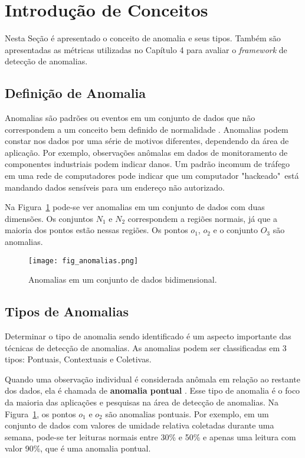 \documentclass[cic,tc]{iiufrgs}
\begin{document}
\section{Introdução de Conceitos}
\label{conceitos}
Nesta Seção é apresentado o conceito de anomalia e seus tipos. Também são apresentadas as métricas utilizadas no Capítulo 4 para avaliar o \textit{framework} de detecção de anomalias.

\subsection{Definição de Anomalia}
\label{anom_def}
Anomalias são padrões ou eventos em um conjunto de dados que não correspondem a um conceito bem definido de normalidade \cite{AnomalyDetectionSurvey2009}. Anomalias podem constar nos dados por uma série de motivos diferentes, dependendo da área de aplicação. Por exemplo, observações anômalas em dados de monitoramento de componentes industriais podem indicar danos. Um padrão incomum de tráfego em uma rede de computadores pode indicar que um computador "hackeado"~está mandando dados sensíveis para um endereço não autorizado.

Na Figura~\ref{fig_anomalias} pode-se ver anomalias em um conjunto de dados com duas dimensões. Os conjuntos $N_1$ e $N_2$ correspondem a regiões normais, já que a maioria dos pontos estão nessas regiões. Os pontos $o_1$, $o_2$ e o conjunto $O_3$ são anomalias.


\begin{figure}
	\caption{Anomalias em um conjunto de dados bidimensional.}
	\bigskip
		\begin{center}
			\texttt{[image: fig\_anomalias.png]}
		\end{center}
	\label{fig_anomalias}
\end{figure}

\subsection{Tipos de Anomalias}
\label{anom_types}
Determinar o tipo de anomalia sendo identificado é um aspecto importante das técnicas de detecção de anomalias. As anomalias podem ser classificadas em 3 tipos: Pontuais, Contextuais e Coletivas.

Quando uma observação individual é considerada anômala em relação ao restante dos dados, ela é chamada de \textbf{anomalia pontual} \cite{AnomalyDetectionSurvey2009}. Esse tipo de anomalia é o foco da maioria das aplicações e pesquisas na área de detecção de anomalias. Na Figura~\ref{fig_anomalias}, os pontos $o_1$ e $o_2$ são anomalias pontuais. Por exemplo, em um conjunto de dados com valores de umidade relativa coletadas durante uma semana, pode-se ter leituras normais entre 30\% e 50\% e apenas uma leitura com valor 90\%, que é uma anomalia pontual. 
\end{document}
